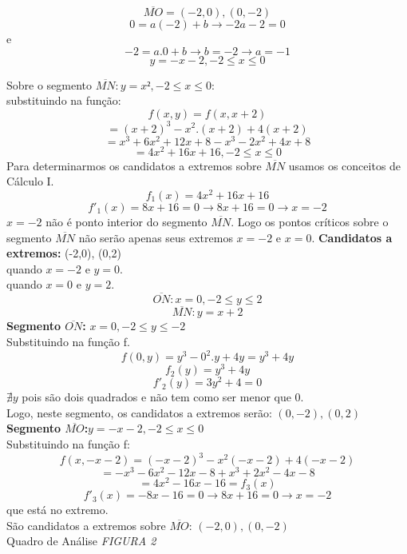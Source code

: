 \documentclass{article}
\begin{document}
		$$\overline{MO}=(-2,0),(0,-2)$$
		$$0=a(-2)+b \to -2a - 2 = 0 $$
		e
		$$-2 = a.0+b \to b = -2 \to a = -1$$
		$$y = -x-2, -2\leq x \leq 0$$
		
		Sobre o segmento $\overline{MN}: y=x², -2 \leq x \leq 0$:\\
		substituindo na função:
		$$f(x,y) = f(x,x+2)$$
		$$= (x+2)^3-x^2.(x+2)+4(x+2)$$
		$$= x^3+6x^2+12x+8-x^3-2x^2+4x+8$$%
		$$=4x^2+16x+16, -2\leq x \leq 0$$%
		Para determinarmos os candidatos a extremos sobre $\overline{MN}$ usamos os conceitos de Cálculo I.
		$$f_1(x)=4x^2+16x+16$$
		$$f'_1(x)=8x+16=0 \to 8x+16=0 \to x=-2$$
		$x=-2$ não é ponto interior do segmento $\overline{MN}$. Logo os pontos críticos sobre o segmento $\overline{MN}$ não serão apenas seus extremos $x=-2$ e $x=0$.
		\textbf{Candidatos a extremos:} (-2,0), (0,2)\\
		quando $x= -2$ e $y=0$.\\
		quando $x=0$ e $y=2$.\\
		$$\overline{ON}: x=0, -2 \leq y \leq 2$$
		$$\overline{MN}: y= x+2$$
		\textbf{Segmento $\overline{ON}$:} $x=0, -2 \leq y \leq -2$\\
		Substituindo na função f.
		$$f(0,y) = y^3-0^2.y+4y = y^3+4y$$
		$$f_2(y) = y^3+4y$$
		$$f'_2(y) = 3y^2 +4 = 0 $$
		$\nexists y$ pois são dois quadrados e não tem como ser menor que 0.\\
		Logo, neste segmento, os candidatos a extremos serão: $(0,-2), (0,2)$
		\textbf{Segmento $\overline{MO}$:}$y=-x-2,-2 \leq x \leq 0$ \\
		Substituindo na função f:\\
		$$f(x,-x-2)=(-x-2)^3-x^2(-x-2)+4(-x-2)$$
		$$=-x^3-6x^2-12x-8+x^3+2x^2-4x-8$$
		$$=4x^2-16x-16 = f_3(x)$$
		$$f'_3(x)=-8x-16=0 \to 8x+16 = 0 \to x=-2$$
		que está no extremo.\\
		São candidatos a extremos sobre $\overline{MO}$: $(-2,0),(0,-2)$\\
		Quadro de Análise \textit{FIGURA 2}\\
		
\end{document}
